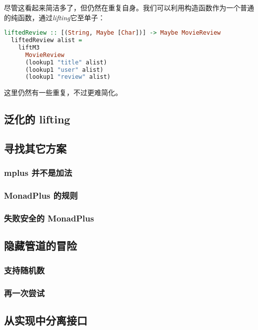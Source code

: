 \documentclass[./main.tex]{subfiles}
\begin{document}
尽管这看起来简洁多了，但仍然在重复自身。我们可以利用构造函数作为一个普通的纯函数，通过\textit{lifting}它至单子：

\begin{lstlisting}[language=Haskell]
  liftedReview :: [(String, Maybe [Char])] -> Maybe MovieReview
  liftedReview alist =
    liftM3
      MovieReview
      (lookup1 "title" alist)
      (lookup1 "user" alist)
      (lookup1 "review" alist)
\end{lstlisting}

这里仍然有一些重复，不过更难简化。

\subsection*{泛化的 lifting}


\subsection*{寻找其它方案}

\subsubsection*{mplus 并不是加法}

\subsubsection*{MonadPlus 的规则}

\subsubsection*{失败安全的 MonadPlus}

\subsection*{隐藏管道的冒险}

\subsubsection*{支持随机数}

\subsubsection*{再一次尝试}

\subsection*{从实现中分离接口}
\end{document}
